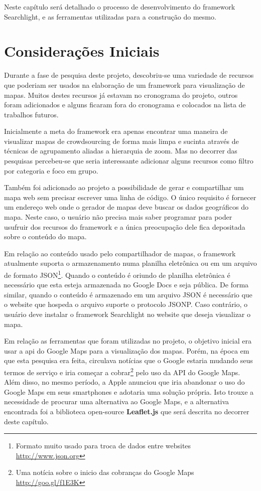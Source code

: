 Neste capítulo será detalhado o processo de desenvolvimento do framework Searchlight, e as ferramentas utilizadas para a construção do mesmo.

\section{Considerações Iniciais}
Durante  a fase de pesquisa deste projeto, descobriu-se uma variedade de recursos que poderiam ser usados na elaboração de um framework para visualização de mapas. Muitos destes recursos já estavam no cronograma do projeto, outros foram adicionados  e alguns ficaram fora do cronograma e colocados na lista de trabalhos futuros.

Inicialmente a meta do framework era apenas encontrar uma maneira de visualizar mapas de crowdsourcing de forma mais limpa e sucinta através de técnicas de agrupamento aliadas a hierarquia de zoom. Mas no decorrer das pesquisas percebeu-se que seria interessante adicionar alguns recursos como filtro por categoria e foco em grupo. 

Também foi adicionado ao projeto a possibilidade de gerar e compartilhar um mapa web sem precisar escrever uma linha de código.
O único requisito é fornecer um endereço web onde o gerador de mapas deve buscar os dados geográficos do mapa. Neste caso, o usuário não precisa mais saber programar para poder usufruir dos recursos do framework e a única preocupação dele fica depositada sobre o conteúdo do mapa.

Em relação ao conteúdo usado pelo compartilhador de mapas, o framework atualmente suporta o armazenamento numa planilha eletrônica ou em um arquivo de formato JSON\footnote{Formato muito usado para troca de dados entre websites \url{http://www.json.org}}. Quando o conteúdo é oriundo de planilha eletrônica é necessário que esta esteja armazenada no Google Docs e seja pública. De forma similar, quando o conteúdo é armazenado em um arquivo JSON é necessário que o website que hospeda o arquivo suporte o protocolo JSONP. Caso contrário, o usuário deve instalar o framework Searchlight no website que deseja visualizar o mapa.


Em relação as ferramentas que foram utilizadas no projeto, o objetivo inicial era usar a api do Google Maps para a visualização dos mapas. Porém,  na época em que esta pesquisa era feita, circulava notícias que o Google estaria mudando seus termos de serviço e iria começar a cobrar\footnote{Uma notícia sobre o inicio das cobranças do Google Maps \url{http://goo.gl/f1E3K}} pelo uso da API do Google Maps. Além disso, no mesmo período, a Apple anunciou que iria abandonar o uso do Google Maps em seus smartphones e adotaria uma solução própria. Isto trouxe a necessidade de procurar uma alternativa ao Google Maps, e a alternativa encontrada foi a biblioteca open-source \textbf{Leaflet.js} que será descrita no decorrer deste capítulo.




